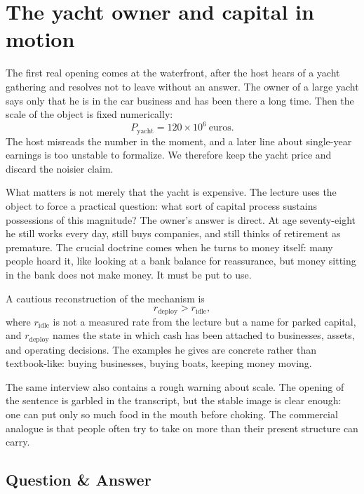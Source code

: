 \section{The yacht owner and capital in motion}

The first real opening comes at the waterfront, after the host hears of a yacht gathering and resolves not to leave without an answer. The owner of a large yacht says only that he is in the car business and has been there a long time. Then the scale of the object is fixed numerically:
\begin{equation}
P_{\text{yacht}} = 120\times 10^{6}\ \text{euros}.
\end{equation}
The host misreads the number in the moment, and a later line about single-year earnings is too unstable to formalize. We therefore keep the yacht price and discard the noisier claim.

What matters is not merely that the yacht is expensive. The lecture uses the object to force a practical question: what sort of capital process sustains possessions of this magnitude? The owner's answer is direct. At age seventy-eight he still works every day, still buys companies, and still thinks of retirement as premature. The crucial doctrine comes when he turns to money itself: many people hoard it, like looking at a bank balance for reassurance, but money sitting in the bank does not make money. It must be put to use.

A cautious reconstruction of the mechanism is
\begin{equation}
r_{\text{deploy}} > r_{\text{idle}},
\end{equation}
where \(r_{\text{idle}}\) is not a measured rate from the lecture but a name for parked capital, and \(r_{\text{deploy}}\) names the state in which cash has been attached to businesses, assets, and operating decisions. The examples he gives are concrete rather than textbook-like: buying businesses, buying boats, keeping money moving.

The same interview also contains a rough warning about scale. The opening of the sentence is garbled in the transcript, but the stable image is clear enough: one can put only so much food in the mouth before choking. The commercial analogue is that people often try to take on more than their present structure can carry.

\subsection{Question \& Answer}

